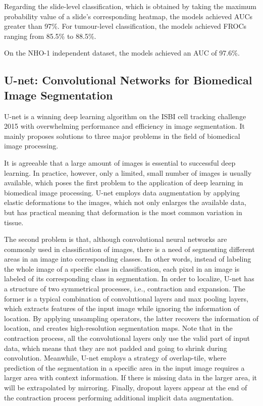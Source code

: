 \documentclass{article}
\begin{document}
Regarding the slide-level classification, which is obtained by taking the maximum probability value of a slide’s corresponding heatmap, the models achieved AUCs greater than 97\%. For tumour-level classification, the models achieved FROCs ranging from 85.5\% to 88.5\%.

On the NHO-1 independent dataset, the models achieved an AUC of 97.6\%.

\subsection{U-net: Convolutional Networks for Biomedical Image Segmentation \cite{Ronneberger2015UNetCN}}

U-net is a winning deep learning algorithm on the ISBI cell tracking challenge 2015 with overwhelming performance and efficiency in image segmentation. It mainly proposes solutions to three major problems in the field of biomedical image processing.

It is agreeable that a large amount of images is essential to successful deep learning. In practice, however, only a limited, small number of images is usually available, which poses the first problem to the application of deep learning in biomedical image processing. U-net employs data augmentation by applying elastic deformations to the images, which not only enlarges the available data, but has practical meaning that deformation is the most common variation in tissue.

The second problem is that, although convolutional neural networks are commonly used in classification of images, there is a need of segmenting different areas in an image into corresponding classes. In other words, instead of labeling the whole image of a specific class in classification, each pixel in an image is labeled of its corresponding class in segmentation. In order to localize, U-net has a structure of two symmetrical processes, i.e., contraction and expansion. The former is a typical combination of convolutional layers and max pooling layers, which extracts features of the input image while ignoring the information of location. By applying unsampling operators, the latter recovers the information of location, and creates high-resolution segmentation maps. Note that in the contraction process, all the convolutional layers only use the valid part of input data, which means that they are not padded and going to shrink during convolution. Meanwhile, U-net employs a strategy of overlap-tile, where prediction of the segmentation in a specific area in the input image requires a larger area with context information. If there is missing data in the larger area, it will be extrapolated by mirroring. Finally, dropout layers appear at the end of the contraction process performing additional implicit data augmentation.
\end{document}
